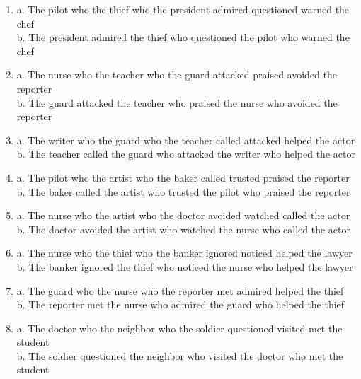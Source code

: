 \documentclass[11pt]{article}
\begin{document}
\begin{enumerate}[label={(\arabic*)}, nosep]
  \item a. The pilot who the thief who the president admired questioned warned the chef \\ b. The president admired the thief who questioned the pilot who warned the chef
  \item a. The nurse who the teacher who the guard attacked praised avoided the reporter \\ b. The guard attacked the teacher who praised the nurse who avoided the reporter
  \item a. The writer who the guard who the teacher called attacked helped the actor \\ b. The teacher called the guard who attacked the writer who helped the actor
  \item a. The pilot who the artist who the baker called trusted praised the reporter \\ b. The baker called the artist who trusted the pilot who praised the reporter
  \item a. The nurse who the artist who the doctor avoided watched called the actor \\ b. The doctor avoided the artist who watched the nurse who called the actor
  \item a. The nurse who the thief who the banker ignored noticed helped the lawyer \\ b. The banker ignored the thief who noticed the nurse who helped the lawyer
  \item a. The guard who the nurse who the reporter met admired helped the thief \\ b. The reporter met the nurse who admired the guard who helped the thief
  \item a. The doctor who the neighbor who the soldier questioned visited met the student \\ b. The soldier questioned the neighbor who visited the doctor who met the student
\end{enumerate}
\end{document}
